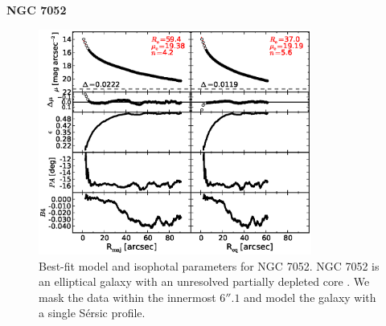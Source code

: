 \documentclass[preprint2]{emulateapj}
\newcommand{\fitfigurewidth}{0.8\textwidth}
\begin{document}
  \clearpage\newpage\noindent
  {\bf NGC 7052 \\}

  \begin{figure}[h]
  \begin{center}
  \includegraphics[width=\fitfigurewidth]{images/n7052_1Dfit.eps}
  \caption{Best-fit model and isophotal parameters for NGC 7052.
  NGC 7052 is an elliptical galaxy with an unresolved partially depleted core \citep{quillen2000}. %
  We mask the data within the innermost $6''.1$ and model the galaxy with a single S\'ersic profile.
  }
  \end{center}
  \end{figure}
\end{document}
